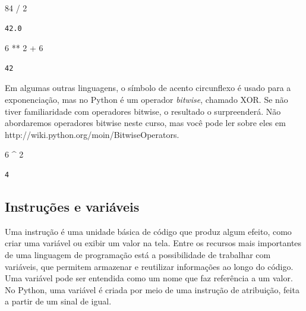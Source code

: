 \documentclass[
  brazilian,
  letterpaper,
  DIV=11,
  numbers=noendperiod]{scrreprt}
\newenvironment{Shaded}{\begin{snugshade}}{\end{snugshade}}
\newcommand{\DecValTok}[1]{\textcolor[rgb]{0.68,0.00,0.00}{#1}}
\newcommand{\OperatorTok}[1]{\textcolor[rgb]{0.37,0.37,0.37}{#1}}
\begin{document}
\begin{Shaded}
\begin{Highlighting}[]
\DecValTok{84} \OperatorTok{/} \DecValTok{2}
\end{Highlighting}
\end{Shaded}

\begin{verbatim}
42.0
\end{verbatim}

\begin{Shaded}
\begin{Highlighting}[]
\DecValTok{6} \OperatorTok{**} \DecValTok{2} \OperatorTok{+} \DecValTok{6}
\end{Highlighting}
\end{Shaded}

\begin{verbatim}
42
\end{verbatim}

Em algumas outras linguagens, o símbolo de acento circunflexo é usado
para a exponenciação, mas no Python é um operador \emph{bitwise},
chamado XOR. Se não tiver familiaridade com operadores bitwise, o
resultado o surpreenderá. Não abordaremos operadores bitwise neste
curso, mas você pode ler sobre eles em
http://wiki.python.org/moin/BitwiseOperators.

\begin{Shaded}
\begin{Highlighting}[]
\DecValTok{6} \OperatorTok{\^{}} \DecValTok{2}
\end{Highlighting}
\end{Shaded}

\begin{verbatim}
4
\end{verbatim}

\subsection{Instruções e
variáveis}\label{instruuxe7uxf5es-e-variuxe1veis}

Uma instrução é uma unidade básica de código que produz algum efeito,
como criar uma variável ou exibir um valor na tela. Entre os recursos
mais importantes de uma linguagem de programação está a possibilidade de
trabalhar com variáveis, que permitem armazenar e reutilizar informações
ao longo do código. Uma variável pode ser entendida como um nome que faz
referência a um valor. No Python, uma variável é criada por meio de uma
instrução de atribuição, feita a partir de um sinal de igual.
\end{document}
